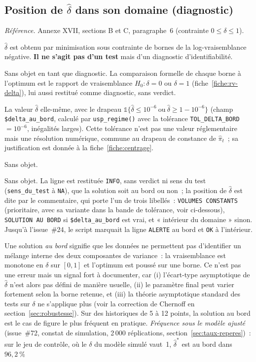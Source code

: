 \documentclass[a4paper,11pt]{article}
\newcommand{\code}[1]{\texttt{\small #1}}
\newcommand{\refl}[1]{{\small\textcolor{maincolor!70!black}{\textit{Référence.} #1}}\par\smallskip}
\newcounter{ficheid}
\newenvironment{fiche}[1]{%
  \stepcounter{ficheid}%
  \phantomsection
  \subsection{#1}%
  \label{fiche:\theficheid}%
}{%
  \end{description}\vspace{0.5em}%
}
\newcommand{\Cadre}{%
  \begin{description}[leftmargin=0pt, style=unboxed, itemsep=3pt, topsep=3pt, parsep=2pt]%
  \item[\textcolor{financeblue}{\textbf{1. Cadre, notations et hypothèses de validité (non testées).}}]}
\newcommand{\Hzero}{\item[\textcolor{financeblue}{\textbf{2. Hypothèse nulle.}}]}
\newcommand{\Stat}{\item[\textcolor{financeblue}{\textbf{3. Statistique de test.}}]}
\newcommand{\Loi}{\item[\textcolor{financeblue}{\textbf{4. Loi sous $H_0$.}}]}
\newcommand{\Pval}{\item[\textcolor{financeblue}{\textbf{5. p-value.}}]}
\newcommand{\Usage}{\item[\textcolor{financeblue}{\textbf{6. Usage et limites.}}]}
\begin{document}
\begin{fiche}{Position de $\hat\delta$ dans son domaine (diagnostic)}
\label{fiche:position-delta}%
\refl{Annexe XVII, sections B et C, paragraphe~6 (contrainte $0 \le \delta \le 1$).}
\Cadre
$\hat\delta$ est obtenu par minimisation sous contrainte de bornes de la log-vraisemblance
négative. \textbf{Il ne s'agit pas d'un test} mais d'un diagnostic d'identifiabilité.
\Hzero
Sans objet en tant que diagnostic. La comparaison formelle de chaque borne à l'optimum est le
rapport de vraisemblance $H_0 : \delta = 0$ ou $\delta = 1$ (fiche~\ref{fiche:rv-delta}), lui aussi
restitué comme diagnostic, sans verdict.
\Stat
La valeur $\hat\delta$ elle-même, avec le drapeau
$\mathds{1}\{\hat\delta \le 10^{-6}\ \text{ou}\ \hat\delta \ge 1 - 10^{-6}\}$
(champ \code{\$delta\_au\_bord}, calculé par \code{usp\_regime()} avec la
tolérance \code{TOL\_DELTA\_BORD} $= 10^{-6}$, inégalités larges). Cette
tolérance n'est pas une valeur réglementaire mais une résolution numérique,
commune au drapeau de constance de $\hat\pi_t$~; sa justification est donnée à
la fiche~\ref{fiche:centrage}.
\Loi
Sans objet.
\Pval
Sans objet. La ligne est restituée \code{INFO}, sans verdict ni sens du test
(\code{sens\_du\_test} à \code{NA}), que la solution soit au bord ou non~; la position de
$\hat\delta$ est dite par le commentaire, qui porte l'un de trois libellés~:
\code{VOLUMES CONSTANTS} (prioritaire, avec sa variante dans la bande de tolérance, voir
ci-dessous), \code{SOLUTION AU BORD} si \code{\$delta\_au\_bord} est vrai, et « intérieur du
domaine » sinon. Jusqu'à l'issue~\#24, le script marquait la ligne \code{ALERTE} au bord et
\code{OK} à l'intérieur.
\Usage
Une solution \emph{au bord} signifie que les données ne permettent pas d'identifier un mélange
interne des deux composantes de variance~: la vraisemblance est monotone en $\delta$ sur $[0,1]$
et l'optimum est poussé sur une borne. Ce n'est pas une erreur mais un signal fort à documenter,
car (i) l'écart-type asymptotique de $\hat\delta$ n'est alors pas défini de manière usuelle,
(ii) le paramètre final peut varier fortement selon la borne retenue, et (iii) la théorie
asymptotique standard des tests sur $\delta$ ne s'applique plus (voir la correction de Chernoff
en section~\ref{sec:robustesse}). Sur des historiques de 5 à 12 points, la solution au bord est le cas de figure le
plus fréquent en pratique. \emph{Fréquence sous le modèle ajusté} (issue~\#72, constat de
simulation, 2\,000 réplications, section~\ref{sec:taux-reperes})~: sur le jeu de contrôle, où
le $\delta$ du modèle simulé vaut~1, $\hat\delta^{*}$ est au bord dans $96{,}2~\%$

\end{fiche}
\end{document}
